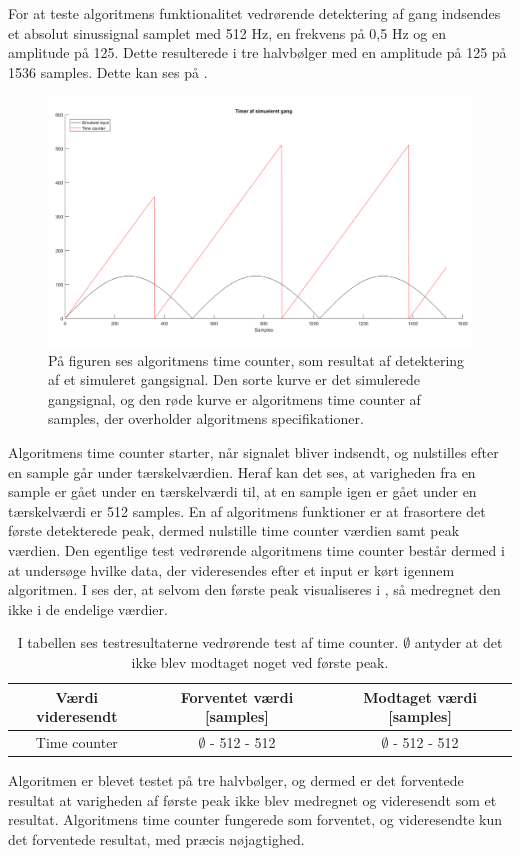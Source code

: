 For at teste algoritmens funktionalitet vedrørende detektering af gang indsendes et absolut sinussignal samplet med 512 Hz, en frekvens på 0,5 Hz og en amplitude på 125. Dette resulterede i tre halvbølger med en amplitude på 125 på 1536 samples. Dette kan ses på .
\begin{figure}[H]
	\centering
	\includegraphics[scale=0.3]{figures/cDesign/test_timecount_gang.png}
	\caption{På figuren ses algoritmens time counter, som resultat af detektering af et simuleret gangsignal. Den sorte kurve er det simulerede gangsignal, og den røde kurve er algoritmens time counter af samples, der overholder algoritmens specifikationer.}
	\label{fig:testgraf_timecounter}
\end{figure}
Algoritmens time counter starter, når signalet bliver indsendt, og nulstilles efter en sample går under tærskelværdien. Heraf kan det ses, at varigheden fra en sample er gået under en tærskelværdi til, at en sample igen er gået under en tærskelværdi er 512 samples. En af algoritmens funktioner er at frasortere det første detekterede peak, dermed nulstille time counter værdien samt peak værdien. Den egentlige test vedrørende algoritmens time counter består dermed i at undersøge hvilke data, der videresendes efter et input er kørt igennem algoritmen. I  ses der, at selvom den første peak visualiseres i , så medregnet den ikke i de endelige værdier.
\begin{table}[H]
	\centering
	\begin{tabular}{ccc}
		\hline
		\rowcolor[HTML]{C0C0C0} 
		Værdi videresendt & Forventet værdi [samples] & Modtaget værdi [samples] \\ \hline
		Time counter & $\emptyset$ - 512 - 512 & $\emptyset$ - 512 - 512 \\ \hline
	\end{tabular}
	\caption{I tabellen ses testresultaterne vedrørende test af time counter. $\emptyset$ antyder at det ikke blev modtaget noget ved første peak.}
	\label{tab:test_res_timecount}
\end{table} \vspace{-0.5cm}
Algoritmen er blevet testet på tre halvbølger, og dermed er det forventede resultat at varigheden af første peak ikke blev medregnet og videresendt som et resultat. Algoritmens time counter fungerede som forventet, og videresendte kun det forventede resultat, med præcis nøjagtighed.

